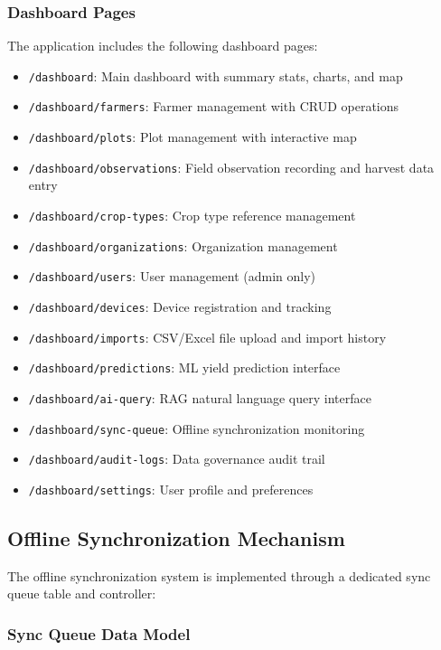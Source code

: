 \subsubsection{Dashboard Pages}

The application includes the following dashboard pages:
\begin{itemize}
  \item \texttt{/dashboard}: Main dashboard with summary stats, charts, and map
  \item \texttt{/dashboard/farmers}: Farmer management with CRUD operations
  \item \texttt{/dashboard/plots}: Plot management with interactive map
  \item \texttt{/dashboard/observations}: Field observation recording and harvest data entry
  \item \texttt{/dashboard/crop-types}: Crop type reference management
  \item \texttt{/dashboard/organizations}: Organization management
  \item \texttt{/dashboard/users}: User management (admin only)
  \item \texttt{/dashboard/devices}: Device registration and tracking
  \item \texttt{/dashboard/imports}: CSV/Excel file upload and import history
  \item \texttt{/dashboard/predictions}: ML yield prediction interface
  \item \texttt{/dashboard/ai-query}: RAG natural language query interface
  \item \texttt{/dashboard/sync-queue}: Offline synchronization monitoring
  \item \texttt{/dashboard/audit-logs}: Data governance audit trail
  \item \texttt{/dashboard/settings}: User profile and preferences
\end{itemize}

\subsection{Offline Synchronization Mechanism}

The offline synchronization system is implemented through a dedicated sync queue table and controller:

\subsubsection{Sync Queue Data Model}

